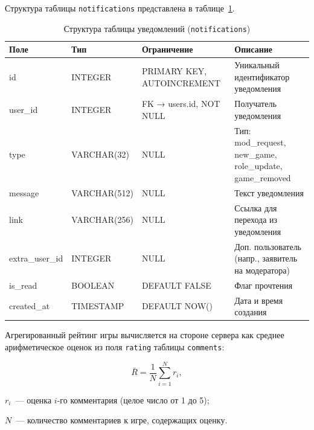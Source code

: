 Структура таблицы \texttt{notifications} представлена в таблице~\ref{tab:db_notifications}.

\begin{table}[ht!]
    \centering
    \caption{Структура таблицы уведомлений (\texttt{notifications})}
    \label{tab:db_notifications}
    \small
    \begin{tabularx}{\textwidth}{|l|l|p{3.5cm}|X|}
        \hline
        \textbf{Поле} & \textbf{Тип} & \textbf{Ограничение} & \textbf{Описание} \\ \hline
        id             & INTEGER      & PRIMARY KEY, AUTOINCREMENT & Уникальный идентификатор уведомления \\ \hline
        user\_id       & INTEGER      & FK → users.id, NOT NULL    & Получатель уведомления \\ \hline
        type           & VARCHAR(32)  & NULL                       & Тип: mod\_request, new\_game, role\_update, game\_removed \\ \hline
        message        & VARCHAR(512) & NULL                       & Текст уведомления \\ \hline
        link           & VARCHAR(256) & NULL                       & Ссылка для перехода из уведомления \\ \hline
        extra\_user\_id & INTEGER     & NULL                       & Доп. пользователь (напр., заявитель на модератора) \\ \hline
        is\_read       & BOOLEAN      & DEFAULT FALSE              & Флаг прочтения \\ \hline
        created\_at    & TIMESTAMP    & DEFAULT NOW()              & Дата и время создания \\ \hline
    \end{tabularx}
\end{table}

Агрегированный рейтинг игры вычисляется на стороне сервера как среднее
арифметическое оценок из поля \texttt{rating} таблицы \texttt{comments}:

\begin{equation}
    \bar{R} = \frac{1}{N} \sum_{i=1}^{N} r_i,
    \label{eq:avg_rating}
\end{equation}

\begin{where}
    \item $r_i$~--- оценка $i$-го комментария (целое число от 1 до 5);
    \item $N$~--- количество комментариев к игре, содержащих оценку.
\end{where}

